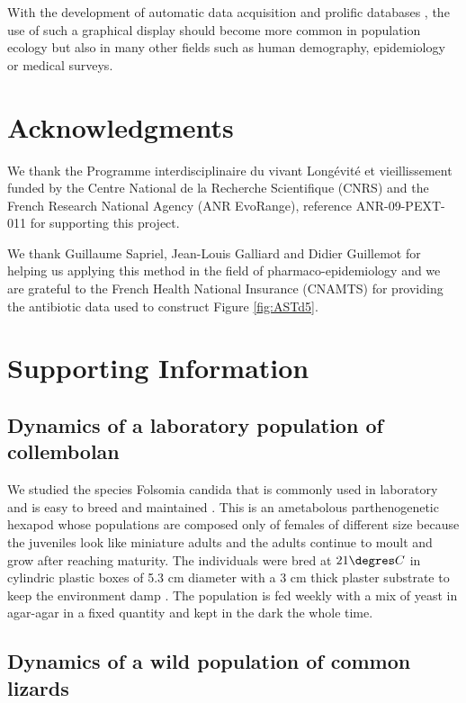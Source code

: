 With the development of automatic data acquisition and prolific databases
\autocites{le-galliard2012a,mallard2012a,mallard2013a}, the use of such a
graphical display should become more common in population ecology but also in
many other fields such as human demography, epidemiology or medical surveys.

\section{Acknowledgments}

We thank the Programme interdisciplinaire du vivant Longévité et vieillissement
funded by the Centre National de la Recherche Scientifique (CNRS) and the French
Research National Agency (ANR EvoRange), reference ANR-09-PEXT-011 for
supporting this project.

We thank Guillaume Sapriel, Jean-Louis Galliard and Didier Guillemot for helping
us applying this method in the field of pharmaco-epidemiology and we are
grateful to the French Health National Insurance (CNAMTS) for providing the
antibiotic data used to construct Figure \ref{fig:ASTd5}.

\section{Supporting Information}

\subsection{Dynamics of a laboratory population of collembolan}

We studied the species Folsomia candida that is commonly used in laboratory and
is easy to breed and maintained \autocites{fountain2005a}. This
is an ametabolous parthenogenetic hexapod whose populations are composed only of females of
different size because the juveniles look like miniature adults and the adults
continue to moult and grow after reaching maturity. The individuals were bred at
$21\degres C$ in cylindric plastic boxes of 5.3 cm diameter with a 3 cm thick
plaster substrate to keep the environment damp \autocites[Fig.
\ref{fig:ASTd1}]{tully2008a}. The population is fed weekly with a mix of
yeast in agar-agar in a fixed quantity and kept in the dark the whole time.

\subsection{Dynamics of a wild population of common lizards}

